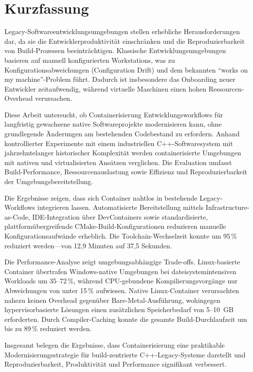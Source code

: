 \chapter{Kurzfassung}

Legacy-Softwareentwicklungsumgebungen stellen erhebliche Herausforderungen dar, da sie die Entwicklerproduktivität einschränken und die Reproduzierbarkeit von Build-Prozessen beeinträchtigen.
Klassische Entwicklungsumgebungen basieren auf manuell konfigurierten Workstations, was zu Konfigurationsabweichungen (Configuration Drift) und dem bekannten ``works on my machine''-Problem führt.
Dadurch ist insbesondere das Onboarding neuer Entwickler zeitaufwendig, während virtuelle Maschinen einen hohen Ressourcen-Overhead verursachen.

Diese Arbeit untersucht, ob Containerisierung Entwicklungsworkflows für langfristig gewachsene native Softwareprojekte modernisieren kann, ohne grundlegende Änderungen am bestehenden Codebestand zu erfordern.
Anhand kontrollierter Experimente mit einem industriellen C++-Softwaresystem mit jahrzehntelanger historischer Komplexität werden containerisierte Umgebungen mit nativen und virtualisierten Ansätzen verglichen.
Die Evaluation umfasst Build-Performance, Ressourcenauslastung sowie Effizienz und Reproduzierbarkeit der Umgebungsbereitstellung.

\begin{sloppypar}
Die Ergebnisse zeigen, dass sich Container nahtlos in bestehende Legacy-Workflows integrieren lassen.
Automatisierte Bereitstellung mittels Infrastructure-as-Code, IDE-Integration über DevContainers sowie standardisierte, plattformübergreifende CMake-Build-Konfigurationen reduzieren manuelle Konfigurationsaufwände erheblich.
Die Toolchain-Wechselzeit konnte um 95\,\% reduziert werden---von 12,9 Minuten auf 37,5 Sekunden.
\end{sloppypar}

Die Performance-Analyse zeigt umgebungsabhängige Trade-offs.
Linux-basierte Container übertrafen Windows-native Umgebungen bei dateisystemintensiven Workloads um 35--72\,\%, während CPU-gebundene Kompilierungsvorgänge nur Abweichungen von unter 15\,\% aufwiesen.
Native Linux-Container verursachten nahezu keinen Overhead gegenüber Bare-Metal-Ausführung, wohingegen hypervisorbasierte Lösungen einen zusätzlichen Speicherbedarf von 5--10~GB erforderten.
Durch Compiler-Caching konnte die gesamte Build-Durchlaufzeit um bis zu 89\,\% reduziert werden.

Insgesamt belegen die Ergebnisse, dass Containerisierung eine praktikable Modernisierungsstrategie für build-zentrierte C++-Legacy-Systeme darstellt und Reproduzierbarkeit, Produktivität und Performance signifikant verbessert.
